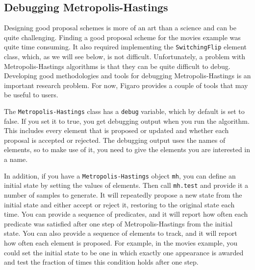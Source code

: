 
\subsection{Debugging Metropolis-Hastings}

Designing good proposal schemes is more of an art than a science and can be quite challenging. Finding a good proposal scheme for the movies example was quite time consuming. It also required implementing the \texttt{SwitchingFlip} element class, which, as we will see below, is not difficult. Unfortunately, a problem with Metropolis-Hastings algorithms is that they can be quite difficult to debug. Developing good methodologies and tools for debugging Metropolis-Hastings is an important research problem. For now, Figaro provides a couple of tools that may be useful to users.

The \texttt{Metropolis-Hastings} class has a \texttt{debug} variable, which by default is set to false. If you set it to true, you get debugging output when you run the algorithm. This includes every element that is proposed or updated and whether each proposal is accepted or rejected. The debugging output uses the names of elements, so to make use of it, you need to give the elements you are interested in a name. 

In addition, if you have a \texttt{Metropolis-Hastings} object \texttt{mh}, you can define an initial state by setting the values of elements. Then call \texttt{mh.test} and provide it a number of samples to generate. It will repeatedly propose a new state from the initial state and either accept or reject it, restoring to the original state each time. You can provide a sequence of predicates, and it will report how often each predicate was satisfied after one step of Metropolis-Hastings from the initial state. You can also provide a sequence of elements to track, and it will report how often each element is proposed. For example, in the movies example, you could set the initial state to be one in which exactly one appearance is awarded and test the fraction of times this condition holds after one step.


